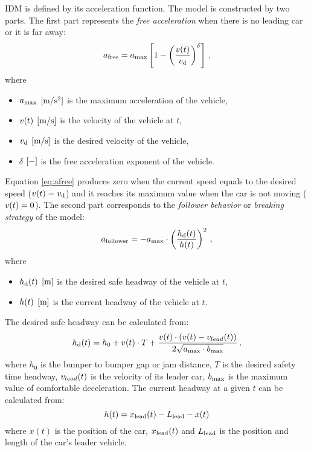 		IDM is defined by its acceleration function. The model is constructed by two parts. The first part represents the \textit{free acceleration} when there is no leading car or it is far away:
		\begin{equation}
			a_{\rm free}=a_{\rm max}\left [ 1 - \left ( \frac{v(t)}{{v_{\rm d}}} \right )^{\delta} \right ]\,,
			\label{eq:afree}
		\end{equation}
		where
		\begin{itemize}
			\item $a_{\rm max}$ $\rm [m/s^2]$ is the maximum acceleration of the vehicle,
			\item $v(t)$ $\rm [m/s]$ is the velocity of the vehicle at $t$,
			\item ${v_{\rm d}}$ $\rm [m/s]$ is the desired velocity of the vehicle,
			\item $\delta$ $\rm [-]$ is the free acceleration exponent of the vehicle.
		\end{itemize}
		Equation \ref{eq:afree} produces zero when the current speed equals to the desired speed ($v(t)={v_{\rm d}}$) and it reaches its maximum value when the car is not moving ($v(t)=0$).
		The second part corresponds to the \textit{follower behavior} or \textit{breaking strategy} of the model:
		\begin{equation}
			a_{\rm follower}=-a_{\rm max}\cdot \left ( \frac{h_{\rm d}(t)}{h(t)} \right )^2\,,
			\label{eq:afollower}
		\end{equation}
		where
		\begin{itemize}
			\item $h_{\rm d}(t)$ $\rm [m]$ is the desired safe headway of the vehicle at $t$,
			\item $h(t)$ $\rm [m]$ is the current headway of the vehicle at $t$.
		\end{itemize}
		The desired safe headway can be calculated from:
		\begin{equation}
			h_{\rm d}(t)=h_0 + v(t)\cdot T + \frac{v(t)\cdot(v(t)-v_{lead}(t))}{2\sqrt{a_{\rm max}\cdot b_{\rm max}}}\,,
		\end{equation}
		where $h_0$ is the bumper to bumper gap or jam distance, $T$ is the desired safety time headway, $v_{lead}(t)$ is the velocity of its leader car, $b_{\rm max}$ is the maximum value of comfortable deceleration.
		The current headway at a given $t$ can be calculated from:
		\begin{equation}
		h(t)=x_{\rm lead}(t)-L_{\rm lead}- x(t)
		\end{equation}
		where $x(t)$ is the position of the car, $x_{\rm lead}(t)$ and $L_{\rm lead}$ is the position and length of the  car's leader vehicle.
